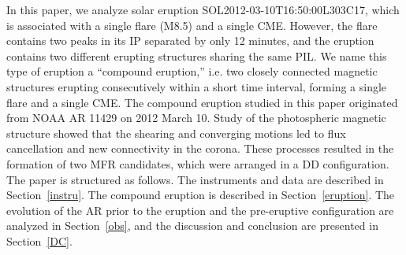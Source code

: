 \documentclass{aastex62}
\begin{document}
In this paper, we analyze solar eruption SOL2012-03-10T16:50:00L303C17, which is associated with a single flare (M8.5) and a single CME. However, the flare contains two peaks in its IP separated by only 12 minutes, and the eruption contains two different erupting structures sharing the same PIL. We name this type of eruption  a ``compound eruption,'' i.e. two closely connected magnetic structures erupting consecutively within a short time interval, forming a single flare and a single CME. The compound eruption studied in this paper originated from NOAA AR 11429 on 2012 March 10. Study of the photospheric magnetic structure showed that the shearing and converging motions led to flux cancellation and new connectivity in the corona. These processes resulted in the formation of two MFR candidates, which were arranged in a DD configuration. The paper is structured as follows. The instruments and data are described in Section~\ref{instru}. The compound eruption is described in Section~\ref{eruption}. The evolution of the AR prior to the eruption and the pre-eruptive configuration are analyzed in Section~\ref{obs}, and the discussion and conclusion are presented in Section~\ref{DC}.
\end{document}
